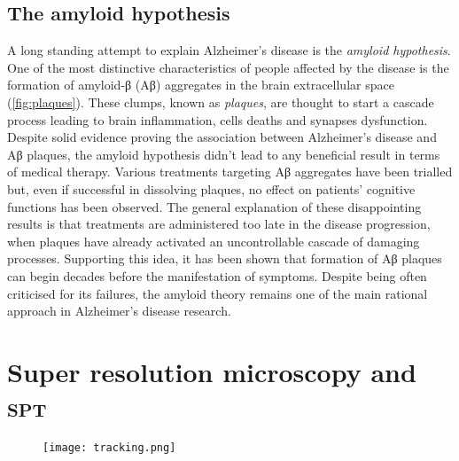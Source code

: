 \subsection{The amyloid hypothesis}

A long standing attempt to explain Alzheimer’s disease is the \emph{amyloid hypothesis}. One of the most distinctive characteristics of people affected by the disease is the formation of amyloid-β (Aβ) aggregates in the brain extracellular space (\cref{fig:plaques}).
These clumps, known as \emph{plaques}, are thought to start a cascade process leading to brain inflammation, cells deaths and synapses dysfunction. Despite solid evidence proving the association between Alzheimer's disease and Aβ plaques, the amyloid hypothesis didn't lead to any beneficial result in terms of medical therapy. Various treatments targeting Aβ aggregates have been trialled but, even if successful in dissolving plaques, no effect on patients' cognitive functions has been observed. The general explanation of these disappointing results is that treatments are administered too late in the disease progression, when plaques have already activated an uncontrollable cascade of damaging processes. Supporting this idea, it has been shown that formation of Aβ plaques can begin decades before the manifestation of symptoms. Despite being often criticised for its failures, the amyloid theory remains one of the main rational approach in Alzheimer's disease research.


\section{Super resolution microscopy and \textsc{spt}}

\begin{figure}
  \texttt{[image: tracking.png]}
\end{figure}

